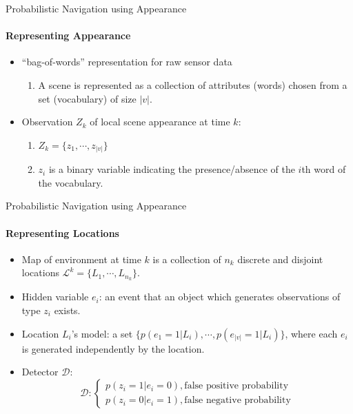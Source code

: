 \documentclass[dvipsnames, handout]{beamer}
\newcommand{\1}{\mathds{1}}	%
\begin{document}
\begin{frame}[t]{Probabilistic Navigation using Appearance}
\framesubtitle{Representing Appearance}
\begin{itemize}
\item ``bag-of-words'' representation for raw sensor data
\begin{enumerate}
\item A scene is represented as a collection of attributes (words) chosen from a set (vocabulary) of size $|v|$.
\end{enumerate}
\item Observation $Z_k$ of local scene appearance at time $k$:
\begin{enumerate}
\item $Z_k = \{z_1, \cdots, z_{|v|} \}$
\item $z_i$ is a binary variable indicating the presence/absence of the $i$th word of the vocabulary.
\end{enumerate}

\end{itemize}
\end{frame}



\begin{frame}[t]{Probabilistic Navigation using Appearance}
\framesubtitle{Representing Locations}
\begin{itemize}
\item Map of environment at time $k$ is a collection of $n_k$ discrete and disjoint locations $\mathcal{L}^k = \{L_1, \cdots, L_{n_k}\}$.
\item Hidden variable $e_i$: an event that an object which generates observations of type $z_i$ exists.
\item Location $L_i$'s model: a set $\{p(e_1=1|L_i), \cdots, p(e_{|v|}=1|L_i)\}$, where each $e_i$ is generated independently by the location.
\item Detector $\mathcal{D}$:
\[\mathcal{D}: 
\begin{cases} 
p(z_i=1|e_i=0) , \text{false positive probability}\\
p(z_i=0|e_i=1) , \text{false negative probability}
\end{cases}    \]
\end{itemize}
\end{frame}
\end{document}

